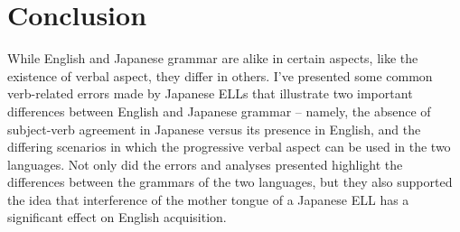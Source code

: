 \documentclass{article}
\begin{document}
\section{Conclusion}
While English and Japanese grammar are alike in certain aspects, like the existence of verbal aspect, they differ in others. I’ve presented some common verb-related errors made by Japanese ELLs that illustrate two important differences between English and Japanese grammar – namely, the absence of subject-verb agreement in Japanese versus its presence in English, and the differing scenarios in which the progressive verbal aspect can be used in the two languages. Not only did the errors and analyses presented highlight the differences between the grammars of the two languages, but they also supported the idea that interference of the mother tongue of a Japanese ELL has a significant effect on English acquisition.



\end{document}
